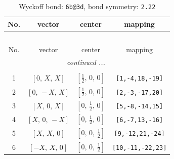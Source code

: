 \documentclass[fleqn,8pt]{jsarticle}
\begin{document}
\begin{longtable}{cccc}
\caption{Wyckoff bond: {\tt 6b@3d}, bond symmetry: {\tt 2.22}}
 \\
 \hline \hline
No. & vector & center & mapping \\ \hline \endfirsthead

\multicolumn{3}{l}{\tablename\ \thetable{}} \\
 \hline \hline
No. & vector & center & mapping \\ \hline \endhead

 \hline \hline
\multicolumn{3}{r}{\footnotesize\it continued ...} \\ \endfoot

 \hline \hline
\multicolumn{3}{r}{} \\ \endlastfoot

1 & $\left[ 0,\, X,\, X \right]$ & $\left[ \frac{1}{2},\, 0,\, 0 \right]$ & {\tt [1,-4,18,-19]} \\ \hline
2 & $\left[ 0,\, - X,\, X \right]$ & $\left[ \frac{1}{2},\, 0,\, 0 \right]$ & {\tt [2,-3,-17,20]} \\ \hline
3 & $\left[ X,\, 0,\, X \right]$ & $\left[ 0,\, \frac{1}{2},\, 0 \right]$ & {\tt [5,-8,-14,15]} \\ \hline
4 & $\left[ X,\, 0,\, - X \right]$ & $\left[ 0,\, \frac{1}{2},\, 0 \right]$ & {\tt [6,-7,13,-16]} \\ \hline
5 & $\left[ X,\, X,\, 0 \right]$ & $\left[ 0,\, 0,\, \frac{1}{2} \right]$ & {\tt [9,-12,21,-24]} \\ \hline
6 & $\left[ - X,\, X,\, 0 \right]$ & $\left[ 0,\, 0,\, \frac{1}{2} \right]$ & {\tt [10,-11,-22,23]} \\
\end{longtable}
\renewcommand{\arraystretch}{1.2}
\end{document}
